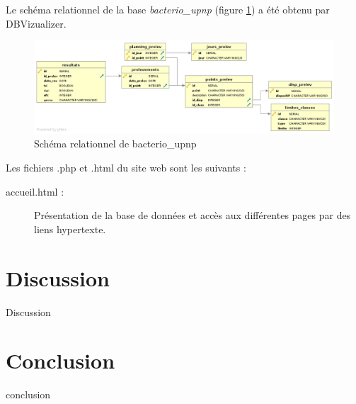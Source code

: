 \documentclass[12pt,a4paper,oneside]{article}
\begin{document}
Le schéma relationnel de la base \emph{bacterio\_upnp} (figure \ref{erd}) a été obtenu par DBVizualizer.
\begin{figure}
\caption{\label{erd}Schéma relationnel de bacterio\_upnp}
\includegraphics[scale=0.4]{erd.png}
\end{figure}

Les fichiers .php et .html du site web sont les suivants :
\begin{description}
\item[accueil.html :] Présentation de la base de données et accès aux différentes pages par des liens hypertexte.

\end{description}

\section{Discussion}
Discussion
\section{Conclusion}
conclusion
\end{document}
